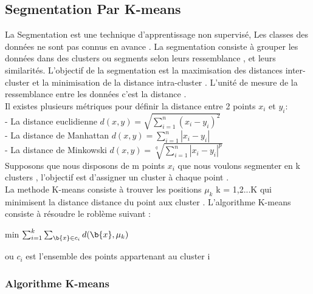 \subsection{Segmentation  Par K-means }
La Segmentation est une technique d'apprentissage non supervisé, Les classes des données ne sont pas connus en avance .
La segmentation consiste à grouper les données dans des clusters ou segments selon leurs ressemblance , et leurs similarités. 
L'objectif de la segmentation est la maximisation des distances inter-cluster et la minimisation de la distance intra-cluster .
L'unité de mesure de la ressemblance entre les données c'est la distance . \\
Il existes plusieurs métriques pour définir la distance entre 2 points ${x}_{i}$ et ${y}_{i}$:  \\
- La distance euclidienne $d(x,y) = \sqrt{\sum_{i=1}^{n}({x}_{i}-{y}_{i})^2}$ \\
- La distance de Manhattan $d(x,y) = \sum_{i=1}^{n}|{x}_{i}-{y}_{i}|$ \\
- La distance de Minkowski $d(x,y) = \sqrt[q]{\sum_{i=1}^{n}|{x}_{i}-{y}_{i}|^p}$ \\
Supposons que nous disposons de m points $x_i$ que nous voulons segmenter en k clusters , l'objectif est d'assigner un cluster à chaque point .\\
 La methode K-means consiste à trouver les positions $\mu_k$  k = 1,2...K qui minimisent la distance distance du point aux cluster .
L'algorithme K-means consiste à résoudre le roblème suivant :\\
\begin{center}
	min $\sum_{i=1}^k\sum_{\b{x}\in c_i} d(\b{x},\mu_k)$
\end{center}
ou $c_i$  est l'ensemble des points appartenant au cluster i 
\subsubsection{Algorithme K-means }
